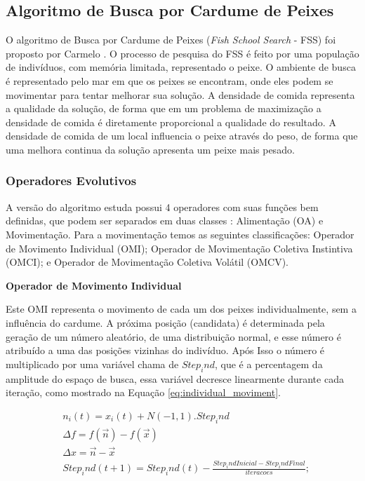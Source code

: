 \subsection{Algoritmo de Busca por Cardume de Peixes}
\label{sec:fish_school_search}
O algoritmo de Busca por Cardume de Peixes (\textit{Fish School Search} - FSS) foi proposto por Carmelo \cite{carmelo2008novel}. O processo de pesquisa do FSS é feito por uma população de indivíduos, com memória limitada, representado o peixe. O ambiente de busca é representado pelo mar em que os peixes se encontram, onde eles podem se movimentar para tentar melhorar sua solução. A densidade de comida representa a qualidade da solução, de forma que em um problema de maximização a densidade de comida é diretamente proporcional a qualidade do resultado. A densidade de comida de um local influencia o peixe através do peso, de forma que uma melhora continua da solução apresenta um peixe mais pesado.

\subsubsection{Operadores Evolutivos}
\label{sec:evolutionary_operators}
A versão do algoritmo estuda possui 4 operadores com suas funções bem definidas, que podem ser separados em duas classes \cite{c2009influence}: Alimentação (OA) e Movimentação. Para a movimentação temos as seguintes classificações: Operador de Movimento Individual (OMI); Operador de Movimentação Coletiva Instintiva (OMCI); e Operador de Movimentação Coletiva Volátil (OMCV).

\noindent \textbf{Operador de Movimento Individual}

Este OMI representa o movimento de cada um dos peixes individualmente, sem a influência do cardume. A próxima posição (candidata) é determinada pela geração de um número aleatório, de uma distribuição normal, e esse número é atribuído a uma das posições vizinhas do indivíduo. Após Isso o número é multiplicado por uma variável chama de $Step_ind$, que é a percentagem da amplitude do espaço de busca, essa variável decresce linearmente durante cada iteração, como mostrado na Equação \ref{eq:individual_moviment}.

\begin{equation}
\label{eq:individual_moviment}
\begin{split}
& n_i(t) = x_i(t) + N(-1,1).Step_ind \\
& \Delta f = f(\vec{n}) - f(\vec{x}) \\
& \Delta x = \vec{n} - \vec{x} \\
& Step_ind(t+1) = Step_ind(t) - \frac{Step_indInicial - Step_indFinal}{iteracoes};
\end{split}
\end{equation}

